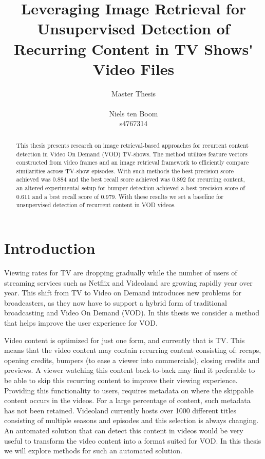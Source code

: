 \documentclass{article}
\begin{document}
\title{Leveraging Image Retrieval for Unsupervised Detection of Recurring Content in TV Shows\'{} Video Files}
\author{Master Thesis\\ \\ Niels ten Boom  \\ s4767314}

\date{\vspace{-3ex}}

\maketitle
\newpage

\begin{abstract}
This thesis presents research on image retrieval-based approaches for recurrent content detection in Video On Demand (VOD) TV-shows. The method utilizes feature vectors constructed from video frames and an image retrieval framework to efficiently compare similarities across TV-show episodes. With such methods the best precision score achieved was 0.884 and the best recall score achieved was 0.892 for recurring content, an altered experimental setup for bumper detection achieved a best precision score of 0.611 and a best recall score of 0.979. With these results we set a baseline for unsupervised detection of recurrent content in VOD videos.
\end{abstract}
\newpage

\tableofcontents
\newpage

\section{Introduction} \label{introduction}
Viewing rates for TV are dropping gradually while the number of users of streaming services such as Netflix and Videoland are growing rapidly year over year. This shift from TV to Video on Demand introduces new problems for broadcasters, as they now have to support a hybrid form of traditional broadcasting and Video On Demand (VOD). In this thesis we consider a method that helps improve the user experience for VOD.

Video content is optimized for just one form, and currently that is TV. This means that the video content may contain recurring content consisting of: recaps, opening credits, bumpers (to ease a viewer into commercials), closing credits and previews. A viewer watching this content back-to-back may find it preferable to be able to skip this recurring content to improve their viewing experience. Providing this functionality to users, requires metadata on where the skippable content occurs in the videos. For a large percentage of content, such metadata has not been retained. Videoland currently hosts over 1000 different titles consisting of multiple seasons and episodes and this selection is always changing. An automated solution that can detect this content in videos would be very useful to transform the video content into a format suited for VOD. In this thesis we will explore methods for such an automated solution.
\end{document}
